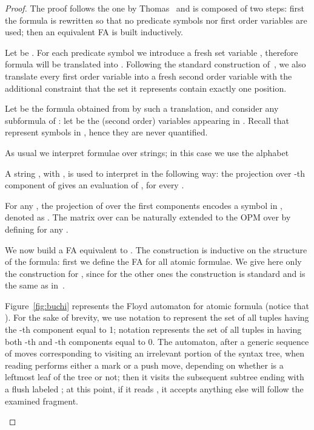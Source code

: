 \documentclass[10pt,a4paper,runningheads]{llncs}
\begin{document}
\begin{proof}
The proof follows the one by Thomas~\cite{thomas90} and is composed of two steps:
first the formula is rewritten so that
no predicate symbols nor first order variables are used;
then an equivalent FA is built inductively.
	
Let  be . For each predicate symbol  we
introduce a fresh set variable , therefore formula  will be
translated into .
Following the standard construction of~\cite{thomas90}, we also translate every first order variable into a fresh
second order variable with the additional constraint that the set it represents
contain exactly one position.



Let  be the formula obtained from  by such a translation,
and consider any subformula  of :
let  be the (second order)
variables appearing in . 
Recall that  represent
symbols in , hence they are never quantified. 

As usual we interpret formulae over strings; in this case we use the alphabet 

A string , with , is used to interpret
 in
the following way: the projection over -th component of  gives  an
evaluation  of , 
for every .

For any , the projection of  over the first  components encodes a symbol in
, denoted as . 
The matrix  over  can be naturally extended to the OPM
 over  by defining 
for any .

We now build a FA  equivalent to . The construction is inductive on the structure of the formula: first we define the FA for all atomic formulae. We give here only the construction for , since for the other ones the construction is standard and is the same as in~\cite{thomas90}. 


Figure~\ref{fig:buchi} represents the Floyd automaton for atomic formula  (notice that ).
For the sake of brevity, we use notation  to represent the set of all tuples
 having the -th component equal to 1; notation 
represents the set of all tuples in  having both -th and -th
components equal to 0.
The automaton, after a generic sequence of moves corresponding to
visiting an irrelevant portion of the syntax tree, when reading 
performs either a mark or a push move, depending on whether  is a
leftmost leaf of the tree or not; then it visits the subsequent
subtree ending with a flush labeled ; at this point, if it reads
, it accepts anything else will follow the examined fragment.

\begin{figure}
\begin{center}
\begin{tikzpicture}[every edge/.style={draw,solid}, node distance=4cm, auto, 
                    every state/.style={draw=black!100,scale=0.5}, >=stealth]


\end{tikzpicture}
\end{center}
\end{figure}
\end{proof}
\end{document}
